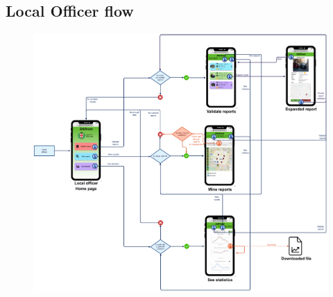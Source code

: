 			\subsection{Local Officer flow}
			\begin{figure}[!h]
				\centering
				\includegraphics[width=\textwidth]{images/Flow/LOFlow}
			\end{figure}
		